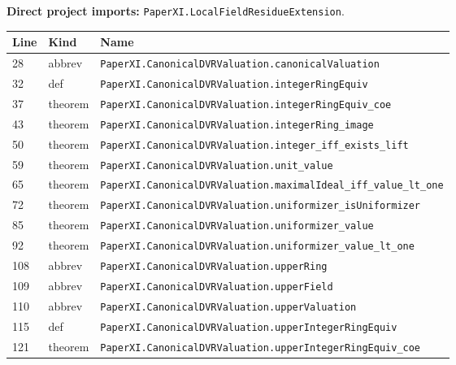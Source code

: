 \documentclass[10pt,oneside]{book}
\begin{document}
\textbf{Direct project imports:} \nolinkurl{PaperXI.LocalFieldResidueExtension}.

\begin{longtable}{@{}p{}p{}p{}@{}}\toprule Line&Kind&Name\\\midrule\endhead

28&abbrev&\nolinkurl{PaperXI.CanonicalDVRValuation.canonicalValuation}\\

32&def&\nolinkurl{PaperXI.CanonicalDVRValuation.integerRingEquiv}\\

37&theorem&\nolinkurl{PaperXI.CanonicalDVRValuation.integerRingEquiv_coe}\\

43&theorem&\nolinkurl{PaperXI.CanonicalDVRValuation.integerRing_image}\\

50&theorem&\nolinkurl{PaperXI.CanonicalDVRValuation.integer_iff_exists_lift}\\

59&theorem&\nolinkurl{PaperXI.CanonicalDVRValuation.unit_value}\\

65&theorem&\nolinkurl{PaperXI.CanonicalDVRValuation.maximalIdeal_iff_value_lt_one}\\

72&theorem&\nolinkurl{PaperXI.CanonicalDVRValuation.uniformizer_isUniformizer}\\

85&theorem&\nolinkurl{PaperXI.CanonicalDVRValuation.uniformizer_value}\\

92&theorem&\nolinkurl{PaperXI.CanonicalDVRValuation.uniformizer_value_lt_one}\\

108&abbrev&\nolinkurl{PaperXI.CanonicalDVRValuation.upperRing}\\

109&abbrev&\nolinkurl{PaperXI.CanonicalDVRValuation.upperField}\\

110&abbrev&\nolinkurl{PaperXI.CanonicalDVRValuation.upperValuation}\\

115&def&\nolinkurl{PaperXI.CanonicalDVRValuation.upperIntegerRingEquiv}\\

121&theorem&\nolinkurl{PaperXI.CanonicalDVRValuation.upperIntegerRingEquiv_coe}\\


\end{longtable}
\end{document}

